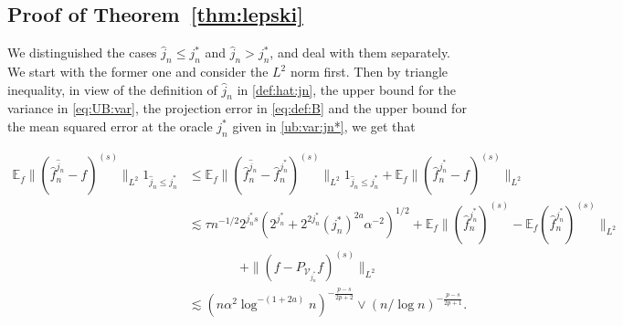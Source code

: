 \documentclass[preprint]{imsart}
\newcommand{\E}{{\mathbb E}}
\numberwithin{equation}{section}
\begin{document}
\begin{appendix}
\subsection{Proof of Theorem~\ref{thm:lepski}}

We distinguished the cases $\hat{j}_n\leq j_n^*$ and $\hat{j}_n>j_n^*$, and deal with them separately. We start with the former one and consider the $L^2$ norm first. Then by triangle inequality, in view of the definition of $\hat{j}_n$ in \eqref{def:hat:jn}, the upper bound for the variance in \eqref{eq:UB:var}, the projection error in \eqref{eq:def:B} and the upper bound for the mean squared error at the oracle $j_n^*$ given in \eqref{ub:var:jn*}, we get that

\begin{align*}
\E_f\|(\hat{f}_n^{\hat{j}_n}-f)^{(s)}\|_{L^2} 1_{\hat{j}_n\leq j_n^*}
&\leq   \E_f\|(\hat{f}_n^{\hat{j}_n}-\hat{f}_n^{j_n^*})^{(s)}\|_{L^2}1_{\hat{j}_n\leq j_n^*}+ \E_f\|(\hat{f}_n^{j_n^*}-f)^{(s)}\|_{L^2}   \\
&\lesssim \tau  n^{-1/2}2^{j_n^*s}(2^{j_n^*}+2^{2j_n^*}(j_n^*)^{2a}\alpha^{-2})^{1/2}+\E_f \|(\hat{f}_n^{j_n^*})^{(s)}-\E_f(\hat{f}_n^{j_n^*})^{(s)} \|_{L^2}\\
&\qquad\qquad+\| (f-P_{\mathcal{V}_{j_n^*}} f)^{(s)}\|_{L^2}\\
& \lesssim (n\alpha^2\log^{-(1+2a)} n)^{-\frac{p-s}{2p+2}}\vee (n/\log n)^{-\frac{p-s}{2p+1}}.
\end{align*}


\end{appendix}
\end{document}
